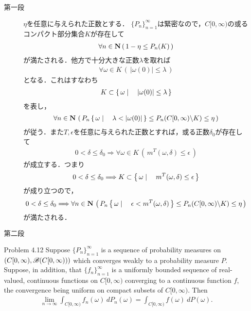 	\begin{sketch}\mbox{}
		\begin{description}
			\item[第一段]
				$\eta$を任意に与えられた正数とする．
				$\{P_n\}_{n=1}^\infty$は緊密なので，$C[0,\infty)$の或るコンパクト部分集合$K$が存在して
				\begin{align}
					\forall n \in \mathbf{N}\, (\, 1 - \eta \leq P_n(K)\, )
				\end{align}
				が満たされる．他方で十分大きな正数$\lambda$を取れば
				\begin{align}
					\forall \omega \in K\, (\, |\omega(0)| \leq \lambda\, )
				\end{align}
				となる．これはすなわち
				\begin{align}
					K \subset \left\{\, \omega \mid \quad |\omega(0)| \leq \lambda\, \right\}
				\end{align}
				を表し，
				\begin{align}
					\forall n \in \mathbf{N}\, \left(\, P_n\left\{\, \omega \mid \quad \lambda < |\omega(0)|\, \right\}
					\leq P_n(C[0,\infty) \backslash K) \leq \eta\, \right)
				\end{align}
				が従う．また$T,\epsilon$を任意に与えられた正数とすれば，或る正数$\delta_0$が存在して
				\begin{align}
					0 < \delta \leq \delta_0
					\Longrightarrow \forall \omega \in K\, \left(\, m^T(\omega,\delta) \leq \epsilon\, \right)
				\end{align}
				が成立する．つまり
				\begin{align}
					0 < \delta \leq \delta_0
					\Longrightarrow K \subset \left\{\, \omega \mid \quad m^T(\omega,\delta) \leq \epsilon\, \right\}
				\end{align}
				が成り立つので，
				\begin{align}
					0 < \delta \leq \delta_0
					\Longrightarrow \forall n \in \mathbf{N}\, \left(\, P_n\left\{\, \omega \mid \quad \epsilon < m^T(\omega,\delta)\, \right\}
					\leq P_n(C[0,\infty) \backslash K) \leq \eta\, \right)
				\end{align}
				が満たされる．
				
			\item[第二段]
		\end{description}
	\end{sketch}
	
	\begin{itembox}[l]{Problem 4.12}
		Suppose $\{P_n\}_{n=1}^\infty$ is a sequence of probability measures on
		$\left( C[0,\infty),\mathscr{B}(C[0,\infty)) \right)$ which converges weakly to a probability
		measure $P$. Suppose, in addition, that $\{f_n\}_{n=1}^\infty$ is a uniformly bounded sequence
		of real-valued, continuous functions on $C[0,\infty)$ converging to a continuous function $f$,
		the convergence being uniform on compact subsets of $C[0,\infty)$. Then
		\begin{align}
			\lim_{n \to \infty} \int_{C[0,\infty)} f_n(\omega)\ dP_n(\omega)
			= \int_{C[0,\infty)} f(\omega)\ dP(\omega).
		\end{align}
	\end{itembox}
	
